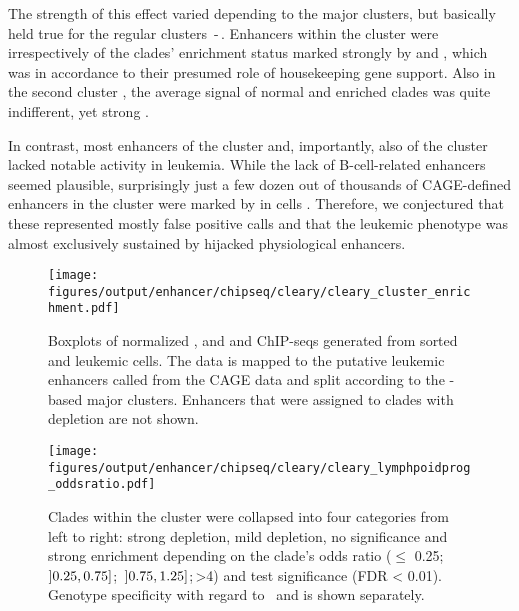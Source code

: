 The strength of this effect varied depending to the \hisfourone major clusters, but basically held true for the regular clusters \,-\,. Enhancers within the \amitone cluster were irrespectively of the clades' enrichment status marked strongly by \hiseighteenac and \histwentysevenac, which was in accordance to their presumed role of housekeeping gene support. Also in the second cluster \amittwo, the average signal of normal and enriched clades was quite indifferent, yet strong . 
 
In contrast, most enhancers of the cluster \amitseven and, importantly, also of the \amitten cluster lacked notable activity in leukemia. While the lack of B-cell-related enhancers seemed plausible, surprisingly just a few dozen out of thousands of CAGE-defined enhancers in the \amitten cluster were marked by \histwentysevenac in \mllafnine cells . Therefore, we conjectured that these represented mostly false positive calls and that the \mllafnine leukemic phenotype was almost exclusively sustained by hijacked physiological enhancers.

 \begin{figure}[!p]
 	\texttt{[image: figures/output/enhancer/chipseq/cleary/cleary\_cluster\_enrichment.pdf]}
 	\caption{Boxplots of normalized \hisfourthree, \hiseighteenac and \histwentysevenac and \hisseventyninetwo ChIP-seqs generated from sorted \mllafnine \kitlow and \kithi leukemic cells. The data is mapped to the putative leukemic enhancers called from the CAGE data and split according to the \hisfourone-based major clusters. Enhancers that were assigned to clades with depletion are not shown.}
 	\label{fig:enhancers:cleary_cluster_enrichment}
 \end{figure}
 
\begin{figure}[!p]
	\texttt{[image: figures/output/enhancer/chipseq/cleary/cleary\_lymphpoidprog\_oddsratio.pdf]}
	\caption{Clades within the cluster \amitthree were collapsed into four categories from left to right: strong depletion, mild depletion, no significance and strong enrichment depending on the clade's odds ratio ($\leq$ \num{0.25};\, \ensuremath{\interval[open left]{0.25}{0.75}};\, \ensuremath{\interval[open left]{0.75}{1.25}};\,>\num{4}) and test significance (FDR < \num{0.01}). Genotype specificity with regard to ~\dnmtwtregular and \dnmtchipregular is shown separately.}
	\label{fig:enhancers:cleary_lymphpoidprog_oddsratio}
\end{figure}

